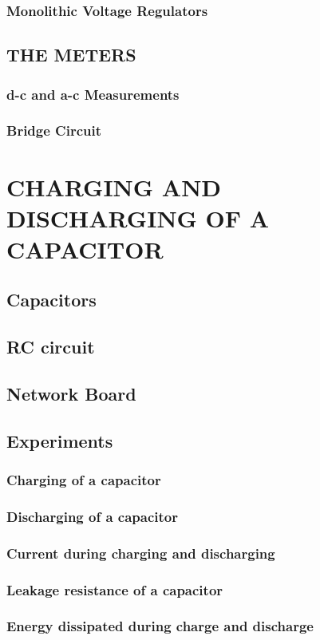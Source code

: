 \documentclass[12pt]{book}
\begin{document}
\subsection{Monolithic Voltage Regulators}
\section{THE METERS}
\label{section:the_meters}
\subsection{d-c and a-c Measurements}
\subsection{Bridge Circuit}

\chapter{CHARGING AND DISCHARGING OF A CAPACITOR}
\section{Capacitors}
\section{RC circuit}
\section{Network Board}
\section{Experiments}
\subsection{Charging of a capacitor}
\subsection{Discharging of a capacitor}
\subsection{Current during charging and discharging}
\subsection{Leakage resistance of a capacitor}
\subsection{Energy dissipated during charge and discharge}
\end{document}
